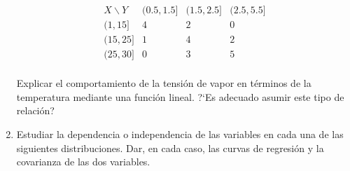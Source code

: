 \documentclass[11pt]{book}
\begin{document}
\begin{enumerate}
$$
    \begin{array}{c|ccc}
        X \backslash Y &  (0\mbox{.}5,1\mbox{.}5] & (1\mbox{.}5,2\mbox{.}5] & (2\mbox{.}5,5\mbox{.}5] \\ \hline
         (1,15] &     4    &   2     &  0      \\
        (15,25] &     1    &   4     &  2      \\
        (25,30] &     0    &   3     &  5      \\
    \end{array}
$$

 Explicar el comportamiento de la tensi\'on de vapor  en t\'erminos de la temperatura  mediante una funci\'on lineal. ?`Es adecuado asumir este tipo de relaci\'on?


\item Estudiar la dependencia o independencia de las variables en cada una de las siguientes distribuciones. Dar, en cada caso, las curvas de regresi\'on y la covarianza de las dos variables.


\end{enumerate}
\end{document}
